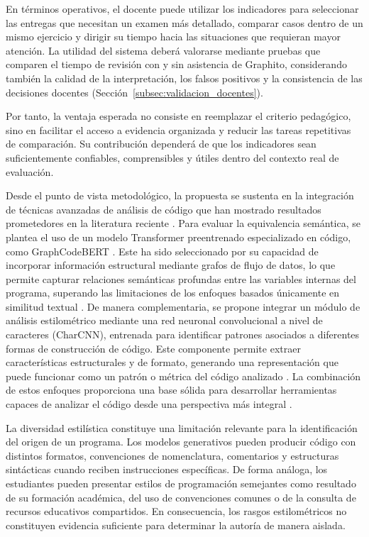 En términos operativos, el docente puede utilizar los indicadores para seleccionar las entregas que necesitan un examen más detallado, comparar casos dentro de un mismo ejercicio y dirigir su tiempo hacia las situaciones que requieran mayor atención. La utilidad del sistema deberá valorarse mediante pruebas que comparen el tiempo de revisión con y sin asistencia de Graphito, considerando también la calidad de la interpretación, los falsos positivos y la consistencia de las decisiones docentes (Sección~\ref{subsec:validacion_docentes}).

Por tanto, la ventaja esperada no consiste en reemplazar el criterio pedagógico, sino en facilitar el acceso a evidencia organizada y reducir las tareas repetitivas de comparación. Su contribución dependerá de que los indicadores sean suficientemente confiables, comprensibles y útiles dentro del contexto real de evaluación.

Desde el punto de vista metodológico, la propuesta se sustenta en la integración de técnicas avanzadas de análisis de código que han mostrado resultados prometedores en la literatura reciente \cite{lehtinen2021students,dickey2025generative}. Para evaluar la equivalencia semántica, se plantea el uso de un modelo Transformer preentrenado especializado en código, como GraphCodeBERT \cite{dickey2025generative}. Este ha sido seleccionado por su capacidad de incorporar información estructural mediante grafos de flujo de datos, lo que permite capturar relaciones semánticas profundas entre las variables internas del programa, superando las limitaciones de los enfoques basados únicamente en similitud textual \cite{dickey2025generative}. De manera complementaria, se propone integrar un módulo de análisis estilométrico mediante una red neuronal convolucional a nivel de caracteres (CharCNN), entrenada para identificar patrones asociados a diferentes formas de construcción de código. Este componente permite extraer características estructurales y de formato, generando una representación que puede funcionar como un patrón o métrica del código analizado \cite{shen2026cognitive}. La combinación de estos enfoques proporciona una base sólida para desarrollar herramientas capaces de analizar el código desde una perspectiva más integral \cite{shen2026cognitive}.

La diversidad estilística constituye una limitación relevante para la identificación del origen de un programa. Los modelos generativos pueden producir código con distintos formatos, convenciones de nomenclatura, comentarios y estructuras sintácticas cuando reciben instrucciones específicas. De forma análoga, los estudiantes pueden presentar estilos de programación semejantes como resultado de su formación académica, del uso de convenciones comunes o de la consulta de recursos educativos compartidos. En consecuencia, los rasgos estilométricos no constituyen evidencia suficiente para determinar la autoría de manera aislada.

